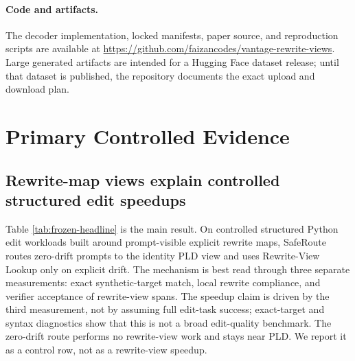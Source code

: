\documentclass[11pt,a4paper]{article}
\begin{document}
\paragraph{Code and artifacts.}
The decoder implementation, locked manifests, paper source, and reproduction
scripts are available at
\url{https://github.com/faizancodes/vantage-rewrite-views}. Large generated
artifacts are intended for a Hugging Face dataset release; until that dataset is
published, the repository documents the exact upload and download plan.

\section{Primary Controlled Evidence}
\label{sec:results}

\subsection{Rewrite-map views explain controlled structured edit speedups}

Table \ref{tab:frozen-headline} is the main result. On controlled
structured Python edit workloads built around prompt-visible explicit
rewrite maps, SafeRoute routes zero-drift prompts to the
identity PLD view and uses Rewrite-View Lookup only on explicit drift.
The mechanism is best read through three
separate measurements: exact synthetic-target match, local rewrite
compliance, and verifier acceptance of rewrite-view spans. The speedup
claim is driven by the third measurement, not by assuming full edit-task
success; exact-target and syntax diagnostics show that this is not a broad
edit-quality benchmark.
The zero-drift route performs no rewrite-view work and stays near PLD.
We report it as a control row, not as a rewrite-view speedup.
\end{document}

